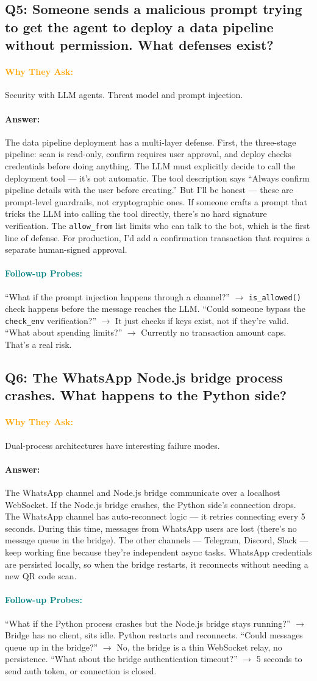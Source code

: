 \documentclass[11pt,a4paper]{article}
\newcommand{\Q}[1]{\subsection{#1}}
\newcommand{\Ans}[1]{\paragraph{\textbf{Answer:}} #1}
\newcommand{\Why}{\paragraph{\textcolor{orange}{\textbf{Why They Ask:}}}}
\newcommand{\Probe}{\paragraph{\textcolor{teal}{\textbf{Follow-up Probes:}}}}
\begin{document}
\Q{Q5: Someone sends a malicious prompt trying to get the agent to deploy a data pipeline without permission. What defenses exist?}
\Why Security with LLM agents. Threat model and prompt injection.
\Ans The data pipeline deployment has a multi-layer defense. First, the three-stage pipeline: scan is read-only, confirm requires user approval, and deploy checks credentials before doing anything. The LLM must explicitly decide to call the deployment tool --- it's not automatic. The tool description says ``Always confirm pipeline details with the user before creating.'' But I'll be honest --- these are prompt-level guardrails, not cryptographic ones. If someone crafts a prompt that tricks the LLM into calling the tool directly, there's no hard signature verification. The \texttt{allow\_from} list limits who can talk to the bot, which is the first line of defense. For production, I'd add a confirmation transaction that requires a separate human-signed approval.
\Probe ``What if the prompt injection happens through a channel?'' $\rightarrow$ \texttt{is\_allowed()} check happens before the message reaches the LLM. ``Could someone bypass the \texttt{check\_env} verification?'' $\rightarrow$ It just checks if keys exist, not if they're valid. ``What about spending limits?'' $\rightarrow$ Currently no transaction amount caps. That's a real risk.

\Q{Q6: The WhatsApp Node.js bridge process crashes. What happens to the Python side?}
\Why Dual-process architectures have interesting failure modes.
\Ans The WhatsApp channel and Node.js bridge communicate over a localhost WebSocket. If the Node.js bridge crashes, the Python side's connection drops. The WhatsApp channel has auto-reconnect logic --- it retries connecting every 5 seconds. During this time, messages from WhatsApp users are lost (there's no message queue in the bridge). The other channels --- Telegram, Discord, Slack --- keep working fine because they're independent async tasks. WhatsApp credentials are persisted locally, so when the bridge restarts, it reconnects without needing a new QR code scan.
\Probe ``What if the Python process crashes but the Node.js bridge stays running?'' $\rightarrow$ Bridge has no client, sits idle. Python restarts and reconnects. ``Could messages queue up in the bridge?'' $\rightarrow$ No, the bridge is a thin WebSocket relay, no persistence. ``What about the bridge authentication timeout?'' $\rightarrow$ 5 seconds to send auth token, or connection is closed.
\end{document}
